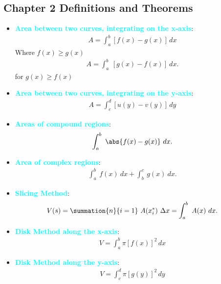 \documentclass{report}
\begin{document}
    \pagebreak \bigbreak \noindent 
    \subsection{Chapter 2 Definitions and Theorems}
    \bigbreak \noindent 
    \begin{itemize}

        \item \textbf{\textcolor{cyan}{Area between two curves, integrating on the x-axis}}:
            \begin{align}
                A = \int_{a}^{b} [f(x) - g(x)] \, dx
            \end{align}
            Where $f(x) \geq g(x)$
            \begin{align*}
                A = \int_{a}^{b}\ [g(x) - f(x)]\ dx
            .\end{align*}
            for $g(x) \geq f(x)$

        \item \textbf{\textcolor{cyan}{Area between two curves, integrating on the y-axis}}:
            \begin{align}
                A = \int_{c}^{d} [u(y) - v(y)] \, dy
            \end{align}

        \item \textbf{\textcolor{cyan}{Areas of compound regions}}:
            \begin{align*}
                \int_{a}^{b}\ \abs{f(x)-g(x)}\ dx 
            .\end{align*}
        \item \textbf{\textcolor{cyan}{Area of complex regions}}:
            \begin{align*}
                \int_{a}^{b}\ f(x)\ dx + \int_{b}^{c}\ g(x)\ dx
            .\end{align*}
        \item \textbf{\textcolor{cyan}{Slicing Method}}:
            \begin{align*}
                V(s) = \summation{n}{i=1}\ A(x_{i}^{*})\ \Delta x  = \int_{a}^{b}\ A(x)\ dx
            .\end{align*}
        \item \textbf{\textcolor{cyan}{Disk Method along the x-axis}}:
            \begin{align}
                V = \int_{a}^{b} \pi [f(x)]^2 \, dx
            \end{align}

        \item \textbf{\textcolor{cyan}{Disk Method along the y-axis}}:
            \begin{align}
                V = \int_{c}^{d} \pi [g(y)]^2 \, dy
            \end{align}


\end{itemize}
\end{document}
